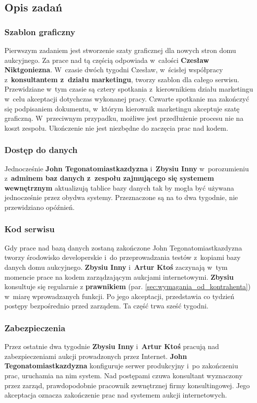 \documentclass[10pt,a4paper]{article}
\begin{document}
\subsection{Opis zadań}
\subsubsection{Szablon graficzny}
\label{sec:zadania_szablon}
Pierwszym zadaniem jest stworzenie szaty graficznej dla nowych stron domu
aukcyjnego. Za prace nad tą częścią odpowiada w~całości \textbf{Czesław
Niktgoniezna}.  W~czasie dwóch tygodni Czesław, w~ścisłej współpracy
z~\textbf{konsultantem z~działu marketingu}, tworzy szablon dla całego serwisu.
Przewidziane w~tym czasie są cztery spotkania z~kierownikiem działu marketingu
w~celu akceptacji dotychczas wykonanej pracy. Czwarte spotkanie ma zakończyć
się podpisaniem dokumentu, w~którym kierownik marketingu akceptuje szatę
graficzną. W~przeciwnym przypadku, możliwe jest przedłużenie procesu nie na
koszt zespołu. Ukończenie nie jest niezbędne do zaczęcia prac nad kodem.

\subsubsection{Dostęp do danych}
\label{sec:zadania_dostep}
Jednocześnie {\bf John Tegonatomiastkazdyzna} i~{\bf Zbysiu Inny}
w~porozumieniu z~{\bf adminem baz danych z~zespołu zajmującego się systemem
wewnętrznym} aktualizują tablice bazy danych tak by mogła być używana
jednocześnie przez obydwa systemy. Przeznaczone są na to dwa tygodnie, nie
przewidziano opóźnień.

\subsubsection{Kod serwisu}
\label{sec:zadania_kod}
Gdy prace nad bazą danych zostaną zakończone John Tegonatomiastkazdyzna
tworzy środowisko developerskie i~do przeprowadzania testów z~kopiami bazy
danych domu aukcyjnego. {\bf Zbysiu Inny} i~{\bf Artur Ktoś} zaczynają w~tym
momencie prace na kodem zarządzającym aukcjami internetowymi. {\bf Zbysiu}
konsultuje się regularnie z {\bf prawnikiem} (par.
\ref{sec:wymagania_od_kontrahenta}) w~miarę wprowadzanych funkcji. Po jego
akceptacji, przedstawia co tydzień postępy bezpośrednio przed zarządem. Ta
część trwa sześć tygodni.

\subsubsection{Zabezpieczenia}
\label{sec:zadania_zabezpieczenia}
Przez ostatnie dwa tygodnie {\bf Zbysiu Inny} i~{\bf Artur Ktoś} pracują nad
zabezpieczeniami aukcji prowadzonych przez Internet. {\bf John
Tegonatomiastkazdyzna} konfiguruje serwer produkcyjny i~po zakończeniu prac,
uruchamia na nim system. Nad postępami czuwa konsultant wyznaczony przez
zarząd, prawdopodobnie pracownik zewnętrznej firmy konsultingowej. Jego
akceptacja oznacza zakończenie prac nad systemem aukcji internetowych.
\end{document}
